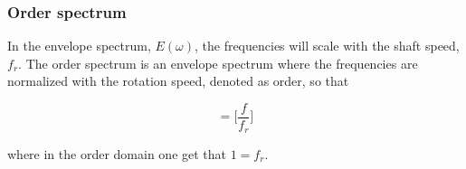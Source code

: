 \begin{frame}
    \frametitle{Order spectrum}
    \small
    
    In the envelope spectrum, $E(\omega)$, the frequencies will scale with the shaft speed, $f_r$. The order spectrum is an envelope spectrum where the frequencies are normalized with the rotation speed, denoted as order, so that
    
    \begin{equation}
        [\text{order}] = \Big[\frac{f}{f_r}\Big]
    \end{equation}
    
    where in the order domain one get that $1 = f_r$.   
\end{frame}
